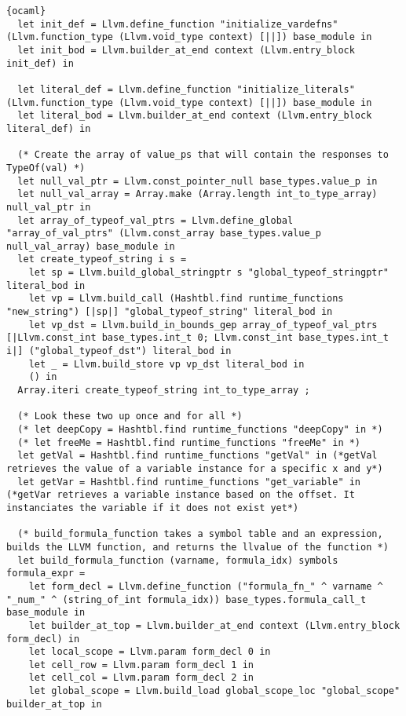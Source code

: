 \begin{lstlisting}{ocaml}
  let init_def = Llvm.define_function "initialize_vardefns" (Llvm.function_type (Llvm.void_type context) [||]) base_module in
  let init_bod = Llvm.builder_at_end context (Llvm.entry_block init_def) in

  let literal_def = Llvm.define_function "initialize_literals" (Llvm.function_type (Llvm.void_type context) [||]) base_module in
  let literal_bod = Llvm.builder_at_end context (Llvm.entry_block literal_def) in

  (* Create the array of value_ps that will contain the responses to TypeOf(val) *)
  let null_val_ptr = Llvm.const_pointer_null base_types.value_p in
  let null_val_array = Array.make (Array.length int_to_type_array) null_val_ptr in
  let array_of_typeof_val_ptrs = Llvm.define_global "array_of_val_ptrs" (Llvm.const_array base_types.value_p null_val_array) base_module in
  let create_typeof_string i s =
    let sp = Llvm.build_global_stringptr s "global_typeof_stringptr" literal_bod in
    let vp = Llvm.build_call (Hashtbl.find runtime_functions "new_string") [|sp|] "global_typeof_string" literal_bod in
    let vp_dst = Llvm.build_in_bounds_gep array_of_typeof_val_ptrs [|Llvm.const_int base_types.int_t 0; Llvm.const_int base_types.int_t i|] ("global_typeof_dst") literal_bod in
    let _ = Llvm.build_store vp vp_dst literal_bod in
    () in
  Array.iteri create_typeof_string int_to_type_array ;

  (* Look these two up once and for all *)
  (* let deepCopy = Hashtbl.find runtime_functions "deepCopy" in *)
  (* let freeMe = Hashtbl.find runtime_functions "freeMe" in *)
  let getVal = Hashtbl.find runtime_functions "getVal" in (*getVal retrieves the value of a variable instance for a specific x and y*)
  let getVar = Hashtbl.find runtime_functions "get_variable" in (*getVar retrieves a variable instance based on the offset. It instanciates the variable if it does not exist yet*)

  (* build_formula_function takes a symbol table and an expression, builds the LLVM function, and returns the llvalue of the function *)
  let build_formula_function (varname, formula_idx) symbols formula_expr =
    let form_decl = Llvm.define_function ("formula_fn_" ^ varname ^ "_num_" ^ (string_of_int formula_idx)) base_types.formula_call_t base_module in
    let builder_at_top = Llvm.builder_at_end context (Llvm.entry_block form_decl) in
    let local_scope = Llvm.param form_decl 0 in
    let cell_row = Llvm.param form_decl 1 in
    let cell_col = Llvm.param form_decl 2 in
    let global_scope = Llvm.build_load global_scope_loc "global_scope" builder_at_top in


\end{lstlisting}
